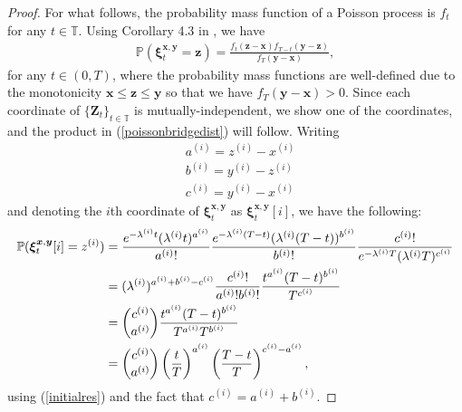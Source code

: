\documentclass{article}
\def\T{\mathbb{T}}
\def\xib{\boldsymbol{\xi}}
\theoremstyle{definition}
\begin{document}
\begin{proof}
For what follows, the probability mass function of a Poisson process is $f_t$ for any $t\in\T$. Using Corollary 4.3 in \cite{goria_random-bridges_2025}, we have
\begin{align}
\mathbb{P}(\xib^{\boldsymbol{x},\boldsymbol{y}}_t = \boldsymbol{z})= \frac{f_{t}(\boldsymbol{z} - \boldsymbol{x})f_{T-t}(\boldsymbol{y} - \boldsymbol{z})}{f_T(\boldsymbol{y} - \boldsymbol{x})}, \label{initialres}
\end{align}
for any $t\in(0,T)$, where the probability mass functions are well-defined due to the monotonicity $\boldsymbol{x} \leq \boldsymbol{z} \leq \boldsymbol{y}$ so that we have $f_T(\boldsymbol{y} - \boldsymbol{x}) > 0$. Since each coordinate of $\{\boldsymbol{Z}_t\}_{t\in\T}$ is mutually-independent, we show one of the coordinates, and the product in (\ref{poissonbridgedist}) will follow. Writing
\begin{align}
&a^{(i)} = z^{(i)} - x^{(i)} \label{simplifiedterms1} \\
&b^{(i)} = y^{(i)} - z^{(i)} \label{simplifiedterms2} \\
&c^{(i)} = y^{(i)} - x^{(i)} \label{simplifiedterms3}
\end{align}
and denoting the $i$th coordinate of $\xib^{\boldsymbol{x},\boldsymbol{y}}_t$ as $\xib^{\boldsymbol{x},\boldsymbol{y}}_t[i]$, we have the following:
\begin{align}
\mathbb{P}(\xib^{\boldsymbol{x},\boldsymbol{y}}_t[i] = z^{(i)}) &= \frac{e^{-\lambda^{(i)}t}(\lambda^{(i)}t)^{a^{(i)}}}{a^{(i)}!}\frac{e^{-\lambda^{(i)}(T-t)}(\lambda^{(i)}(T-t))^{b^{(i)}}}{b^{(i)}!}\frac{c^{(i)}!}{e^{-\lambda^{(i)}T}(\lambda^{(i)}T)^{c^{(i)}}} \notag \\
&= (\lambda^{(i)})^{a^{(i)} + b^{(i)} - c^{(i)}} \frac{c^{(i)}!}{a^{(i)}!b^{(i)}!} \frac{t^{a^{(i)}}(T-t)^{b^{(i)}}}{T^{c^{(i)}}} \notag \\
&= {{c^{(i)}}\choose{a^{(i)}}} \frac{t^{a^{(i)}}(T-t)^{b^{(i)}}}{T^{a^{(i)}}T^{b^{(i)}}} \notag \\
&= {{c^{(i)}}\choose{a^{(i)}}} \left(\frac{t}{T}\right)^{a^{(i)}} \left(\frac{T-t}{T}\right)^{c^{(i)} - a^{(i)}}, \notag
\end{align}
using (\ref{initialres}) and the fact that $c^{(i)} = a^{(i)} + b^{(i)}$.
\end{proof}
\end{document}
